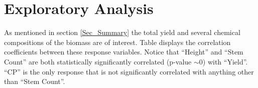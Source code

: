 \section*{Exploratory Analysis} \label{Sec_Data}

As mentioned in section \ref{Sec_Summary} the total yield and several chemical compositions of the biomass are of interest. Table \label{Tab:Tab1} displays the correlation coefficients between these response variables. Notice that ``Height'' and ``Stem Count'' are both statistically significantly correlated (p-value $\sim 0$) with ``Yield''. ``CP'' is the only response that is not significantly correlated with anything other than ``Stem Count''. 

